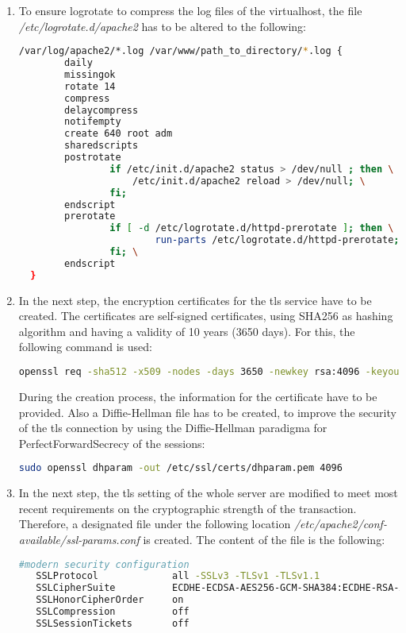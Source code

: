 \begin{enumerate}
  \begin{lstlisting}
   sudo touch /var/www/path_to_directory/error.log
   sudo touch /var/www/path_to_directory/access.log
  \end{lstlisting}
  \item To ensure logrotate to compress the log files of the virtualhost, the file \emph{/etc/logrotate.d/apache2} has to be altered to the following:
  \begin{lstlisting}[language=bash]
   /var/log/apache2/*.log /var/www/path_to_directory/*.log {
        daily
        missingok
        rotate 14
        compress
        delaycompress
        notifempty
        create 640 root adm
        sharedscripts
        postrotate
                if /etc/init.d/apache2 status > /dev/null ; then \
                    /etc/init.d/apache2 reload > /dev/null; \
                fi;
        endscript
        prerotate
                if [ -d /etc/logrotate.d/httpd-prerotate ]; then \
                        run-parts /etc/logrotate.d/httpd-prerotate; \
                fi; \
        endscript
  }
  \end{lstlisting}
  
  \item In the next step, the encryption certificates for the tls service have to be created. The certificates are self-signed certificates, using SHA256 as 
  hashing algorithm and having a validity of 10 years (3650 days). For this, the following command is used:
  \begin{lstlisting}[language=bash]
   openssl req -sha512 -x509 -nodes -days 3650 -newkey rsa:4096 -keyout /etc/ssl/private/[servername].key -out /etc/ssl/certs/[servername].crt
  \end{lstlisting}
  During the creation process, the information for the certificate have to be provided. Also a Diffie-Hellman file has to be created, to improve the security of the tls connection 
  by using the Diffie-Hellman paradigma for PerfectForwardSecrecy of the sessions:
  \begin{lstlisting}[language=bash]
   sudo openssl dhparam -out /etc/ssl/certs/dhparam.pem 4096
  \end{lstlisting}
  \item In the next step, the tls setting of the whole server are modified to meet most recent requirements on the cryptographic strength of the transaction. Therefore, a 
  designated file under the following location \emph{/etc/apache2/conf-available/ssl-params.conf} is created. The content of the file is the following:
  \begin{lstlisting}[language=bash]
   #modern security configuration
   SSLProtocol             all -SSLv3 -TLSv1 -TLSv1.1
   SSLCipherSuite          ECDHE-ECDSA-AES256-GCM-SHA384:ECDHE-RSA-AES256-GCM-SHA384:ECDHE-ECDSA-CHACHA20-POLY1305:ECDHE-RSA-CHACHA20-POLY1305:ECDHE-ECDSA-AES128-GCM-SHA256:ECDHE-RSA-AES128-GCM-SHA256:ECDHE-ECDSA-AES256-SHA384:ECDHE-RSA-AES256-SHA384:ECDHE-ECDSA-AES128-SHA256:ECDHE-RSA-AES128-SHA256
   SSLHonorCipherOrder     on
   SSLCompression          off
   SSLSessionTickets       off


\end{lstlisting}
\end{enumerate}
